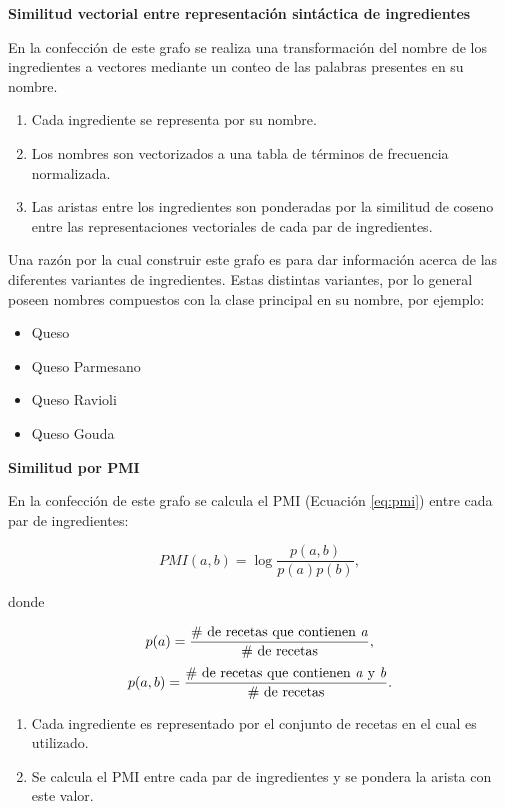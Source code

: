 \documentclass[
	a4paper, %
	10pt, %
	unnumberedsections, %
	twoside, %
]{LTJournalArticle}
\begin{document}
\textbf{Similitud vectorial entre representación sintáctica de ingredientes}

En la confección de este grafo se realiza una transformación del nombre de los ingredientes a vectores mediante
un conteo de las palabras presentes en su nombre.

\begin{enumerate}
	\item Cada ingrediente se representa por su nombre.
	\item Los nombres son vectorizados a una tabla de términos de frecuencia normalizada.
	\item Las aristas entre los ingredientes son ponderadas por la similitud de coseno entre las 
	representaciones vectoriales de cada par de ingredientes.
\end{enumerate}

Una razón por la cual construir este grafo es para dar información acerca de las diferentes variantes de ingredientes.
Estas distintas variantes, por lo general poseen nombres compuestos con la clase principal en su nombre, por ejemplo:

\begin{itemize}
	\item Queso
	\item Queso Parmesano
	\item Queso Ravioli
	\item Queso Gouda
\end{itemize}

\textbf{Similitud por PMI}

En la confección de este grafo se calcula el PMI \autocite{teng2012recipe} (Ecuación \ref{eq:pmi}) entre cada par de ingredientes:

\begin{equation}
	PMI(a, b) = \log \frac{p(a,b)}{p(a)p(b)},
	\label{eq:pmi}
\end{equation}

donde

\begin{equation*}
	p(a) = \frac{\text{\# de recetas que contienen \textit{a}}}{\text{\# de recetas}},
\end{equation*}
\begin{equation*}
	p(a,b) = \frac{\text{\# de recetas que contienen \textit{a} y \textit{b}}}{\text{\# de recetas}}.
\end{equation*}

\begin{enumerate}
	\item Cada ingrediente es representado por el conjunto de recetas en el cual es utilizado.
	\item Se calcula el PMI entre cada par de ingredientes y se pondera la arista con este valor.
\end{enumerate}
\end{document}
